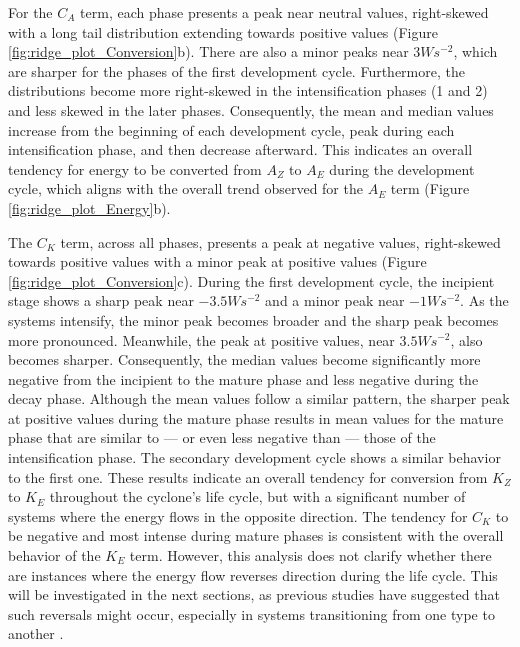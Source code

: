 For the $C_A$ term, each phase presents a peak near neutral values, right-skewed with a long tail distribution extending towards positive values (Figure \ref{fig:ridge_plot_Conversion}b). There are also a minor peaks near $3 W s^{-2}$, which are sharper for the phases of the first development cycle. Furthermore, the distributions become more right-skewed in the intensification phases (1 and 2) and less skewed in the later phases. Consequently, the mean and median values increase from the beginning of each development cycle, peak during each intensification phase, and then decrease afterward. This indicates an overall tendency for energy to be converted from $A_Z$ to $A_E$ during the development cycle, which aligns with the overall trend observed for the $A_E$ term (Figure \ref{fig:ridge_plot_Energy}b).

The $C_K$ term, across all phases, presents a peak at negative values, right-skewed towards positive values with a minor peak at positive values (Figure \ref{fig:ridge_plot_Conversion}c). During the first development cycle, the incipient stage shows a sharp peak near $-3.5 W s^{-2}$ and a minor peak near $-1 W s^{-2}$. As the systems intensify, the minor peak becomes broader and the sharp peak becomes more pronounced. Meanwhile, the peak at positive values, near $3.5 W s^{-2}$, also becomes sharper. Consequently, the median values become significantly more negative from the incipient to the mature phase and less negative during the decay phase. Although the mean values follow a similar pattern, the sharper peak at positive values during the mature phase results in mean values for the mature phase that are similar to — or even less negative than — those of the intensification phase. The secondary development cycle shows a similar behavior to the first one. These results indicate an overall tendency for conversion from $K_Z$ to $K_E$ throughout the cyclone's life cycle, but with a significant number of systems where the energy flows in the opposite direction. The tendency for $C_K$ to be negative and most intense during mature phases is consistent with the overall behavior of the $K_E$ term. However, this analysis does not clarify whether there are instances where the energy flow reverses direction during the life cycle. This will be investigated in the next sections, as previous studies have suggested that such reversals might occur, especially in systems transitioning from one type to another \citep[e.g.,]{brennan1980zonal,michaelides1987limited,wahab2002mechanism,veiga2008analysis,pezza2010environmental}.

